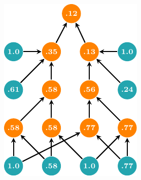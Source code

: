 \documentclass[xcolor={usenames,dvipsnames,svgnames}, compress]{beamer}
\begin{document}
\begin{frame}[t]
\begin{figure}[!ht]
   \begin{subfigure}[b]{0.15\columnwidth}
     \includegraphics[width=1.0\columnwidth]
     {figures/mpn-eval-ii}%
   \end{subfigure}\hspace{5pt}\parbox[b][30pt][b]{0.03\columnwidth}{\subcaption{\label{fig:mpn-eval-ii}}}\hspace{15pt}
   \begin{subfigure}[b]{0.15\columnwidth}

\end{subfigure}
\end{figure}
\end{frame}
\end{document}

